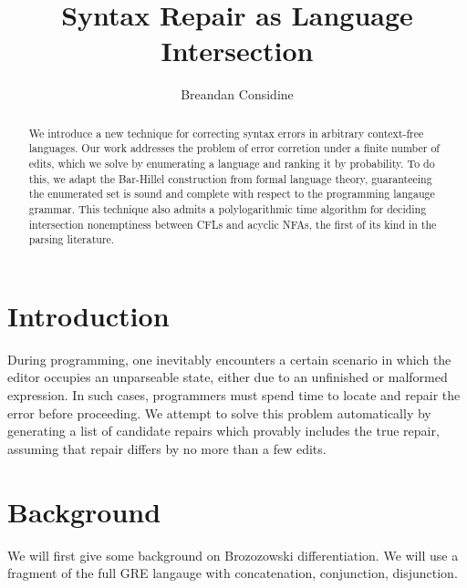 \documentclass[sigplan,review,acmsmall,nonacm,screen,anonymous]{acmart}\settopmatter{printfolios=false,printccs=false,printacmref=false}
\begin{document}
%
  \title{Syntax Repair as Language Intersection}
  \begin{abstract}
    We introduce a new technique for correcting syntax errors in arbitrary context-free languages. Our work addresses the problem of error corretion under a finite number of edits, which we solve by enumerating a language and ranking it by probability. To do this, we adapt the Bar-Hillel construction from formal language theory, guaranteeing the enumerated set is sound and complete with respect to the programming langauge grammar. This technique also admits a polylogarithmic time algorithm for deciding intersection nonemptiness between CFLs and acyclic NFAs, the first of its kind in the parsing literature.
  \end{abstract}

  \author{Breandan Considine}

  \maketitle

  \section{Introduction}

  During programming, one inevitably encounters a certain scenario in which the editor occupies an unparseable state, either due to an unfinished or malformed expression. In such cases, programmers must spend time to locate and repair the error before proceeding. We attempt to solve this problem automatically by generating a list of candidate repairs which provably includes the true repair, assuming that repair differs by no more than a few edits.

  \section{Background}

  We will first give some background on Brozozowski differentiation. We will use a fragment of the full GRE langauge with concatenation, conjunction, disjunction.
\end{document}
